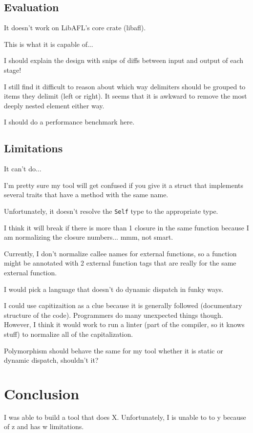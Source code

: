 \documentclass[11pt]{article}
\begin{document}
\subsection{Evaluation}

It doesn't work on LibAFL's core crate (libafl).

This is what it is capable of...

I should explain the design with snips of diffs between input and output of each stage!

I still find it difficult to reason about which way delimiters should be grouped to items they delimit (left or right).
It seems that it is awkward to remove the most deeply nested element either way.

I should do a performance benchmark here.

\subsection{Limitations}
It can't do...

I'm pretty sure my tool will get confused if you give it a struct that implements several traits that have a method with the same name.

Unfortunately, it doesn't resolve the \lstinline{Self} type to the appropriate type.

I think it will break if there is more than 1 closure in the same function because I am normalizing the closure numbers... mmm, not smart.

Currently, I don't normalize callee names for external functions, so a function might be annotated with 2 external function tags that are really for the same external function.

I would pick a language that doesn't do dynamic dispatch in funky ways.

I could use capitizaition as a clue because it is generally followed (documentary structure of the code).
Programmers do many unexpected things though.
However, I think it would work to run a linter (part of the compiler, so it knows stuff) to normalize all of the capitalization.

Polymorphism should behave the same for my tool whether it is static or dynamic dispatch, shouldn't it?

\section{Conclusion}
I was able to build a tool that does X.
Unfortunately, I is unable to to y because of z and has w limitations.
\end{document}
